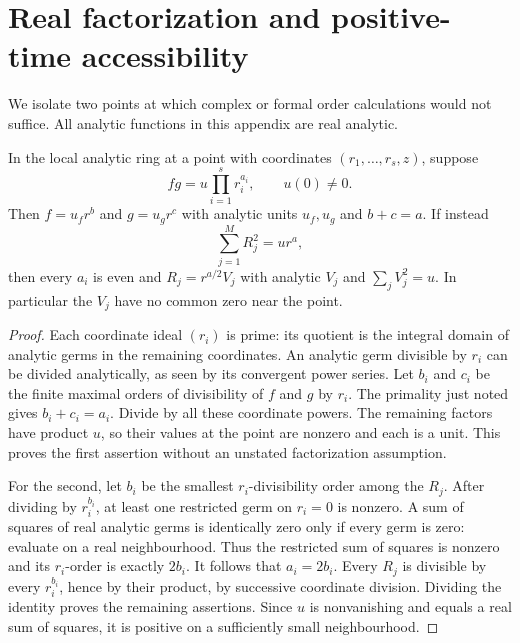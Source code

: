 \appendix
\section{Real factorization and positive-time accessibility}\label{app:real}
We isolate two points at which complex or formal order calculations would not suffice. All analytic functions in this appendix are real analytic.

\begin{lemma}\label{lem:factor}
In the local analytic ring at a point with coordinates $(r_1,\ldots,r_s,z)$, suppose
\[
 f g=u\prod_{i=1}^s r_i^{a_i},\qquad u(0)\ne0.
\]
Then $f=u_f r^b$ and $g=u_g r^c$ with analytic units $u_f,u_g$ and $b+c=a$. If instead
\[
 \sum_{j=1}^M R_j^2=u r^a,
\]
then every $a_i$ is even and $R_j=r^{a/2}V_j$ with analytic $V_j$ and $\sum_jV_j^2=u$. In particular the $V_j$ have no common zero near the point.
\end{lemma}
\begin{proof}
Each coordinate ideal $(r_i)$ is prime: its quotient is the integral domain of analytic germs in the remaining coordinates. An analytic germ divisible by $r_i$ can be divided analytically, as seen by its convergent power series. Let $b_i$ and $c_i$ be the finite maximal orders of divisibility of $f$ and $g$ by $r_i$. The primality just noted gives $b_i+c_i=a_i$. Divide by all these coordinate powers. The remaining factors have product $u$, so their values at the point are nonzero and each is a unit. This proves the first assertion without an unstated factorization assumption.

For the second, let $b_i$ be the smallest $r_i$-divisibility order among the $R_j$. After dividing by $r_i^{b_i}$, at least one restricted germ on $r_i=0$ is nonzero. A sum of squares of real analytic germs is identically zero only if every germ is zero: evaluate on a real neighbourhood. Thus the restricted sum of squares is nonzero and its $r_i$-order is exactly $2b_i$. It follows that $a_i=2b_i$. Every $R_j$ is divisible by every $r_i^{b_i}$, hence by their product, by successive coordinate division. Dividing the identity proves the remaining assertions. Since $u$ is nonvanishing and equals a real sum of squares, it is positive on a sufficiently small neighbourhood.
\end{proof}

